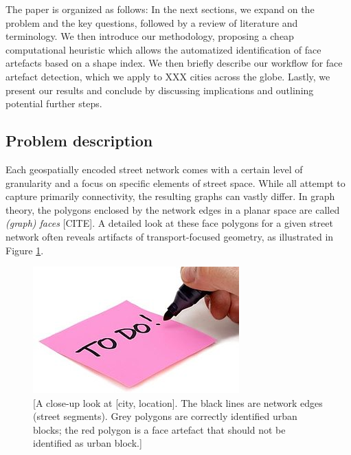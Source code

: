The paper is organized as follows: In the next sections, we expand on the problem and the key questions, followed by a review of literature and terminology. We then introduce our methodology, proposing a cheap computational heuristic which allows the automatized identification of face artefacts based on a shape index. We then briefly describe our workflow for face artefact detection, which we apply to XXX cities across the globe. Lastly, we present our results and conclude by discussing implications and outlining potential further steps.




\subsection*{Problem description}
Each geospatially encoded street network comes with a certain level of granularity and a
focus on specific elements of street space. While all attempt to capture primarily connectivity, the resulting graphs can vastly differ. In graph theory, the polygons enclosed by the network edges in a planar space are called \textit{(graph) faces} [CITE]. A detailed look at these face polygons for a given street network often reveals artifacts of transport-focused geometry, as illustrated in Figure \ref{fig:01}.

\begin{figure}
    \centering
    \includegraphics{figures/todop}
    \caption{[A close-up look at [city, location]. The black lines are network edges (street segments). Grey polygons are correctly identified urban blocks; the red polygon is a face artefact that should not be identified as urban block.]}
    \label{fig:01}
\end{figure}

